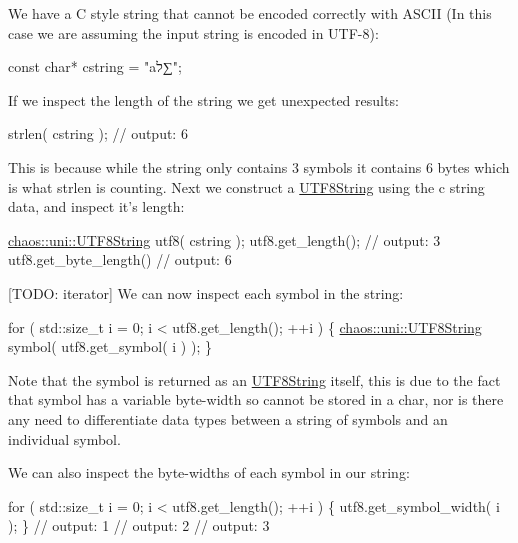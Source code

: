 We have a C style string that cannot be encoded correctly with A\-S\-C\-I\-I (In this case we are assuming the input string is encoded in U\-T\-F-\/8)\-:


\begin{DoxyCode}
\textcolor{keyword}{const} \textcolor{keywordtype}{char}* cstring = \textcolor{stringliteral}{"aל∑"};
\end{DoxyCode}


If we inspect the length of the string we get unexpected results\-:


\begin{DoxyCode}
strlen( cstring );
\textcolor{comment}{// output: 6}
\end{DoxyCode}


This is because while the string only contains 3 symbols it contains 6 bytes which is what {\ttfamily strlen} is counting. Next we construct a \hyperlink{classchaos_1_1uni_1_1_u_t_f8_string}{U\-T\-F8\-String} using the c string data, and inspect it's length\-:


\begin{DoxyCode}
\hyperlink{classchaos_1_1uni_1_1_u_t_f8_string}{chaos::uni::UTF8String} utf8( cstring );
utf8.get\_length();
\textcolor{comment}{// output: 3}
utf8.get\_byte\_length()
\textcolor{comment}{// output: 6}
\end{DoxyCode}


\mbox{[}T\-O\-D\-O\-: iterator\mbox{]} We can now inspect each symbol in the string\-:


\begin{DoxyCode}
\textcolor{keywordflow}{for} ( std::size\_t i = 0; i < utf8.get\_length(); ++i )
\{
    \hyperlink{classchaos_1_1uni_1_1_u_t_f8_string}{chaos::uni::UTF8String} symbol( utf8.get\_symbol( i ) );
\}
\end{DoxyCode}


Note that the symbol is returned as an \hyperlink{classchaos_1_1uni_1_1_u_t_f8_string}{U\-T\-F8\-String} itself, this is due to the fact that symbol has a variable byte-\/width so cannot be stored in a {\ttfamily char}, nor is there any need to differentiate data types between a string of symbols and an individual symbol.

We can also inspect the byte-\/widths of each symbol in our string\-:


\begin{DoxyCode}
\textcolor{keywordflow}{for} ( std::size\_t i = 0; i < utf8.get\_length(); ++i )
\{
    utf8.get\_symbol\_width( i );
\}
\textcolor{comment}{// output: 1}
\textcolor{comment}{// output: 2}
\textcolor{comment}{// output: 3}
\end{DoxyCode}



